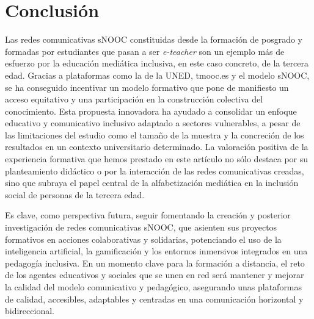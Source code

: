\section{Conclusión}\label{sec-conclusión}

Las redes comunicativas sNOOC constituidas desde la formación de
posgrado y formadas por estudiantes que pasan a ser \emph{e-teacher} son
un ejemplo más de esfuerzo por la educación mediática inclusiva, en este
caso concreto, de la tercera edad. Gracias a plataformas como la de la
UNED, tmooc.es y el modelo sNOOC, se ha conseguido incentivar un modelo
formativo que pone de manifiesto un acceso equitativo y una
participación en la construcción colectiva del conocimiento. Esta
propuesta innovadora ha ayudado a consolidar un enfoque educativo y
comunicativo inclusivo adaptado a sectores vulnerables, a pesar de las
limitaciones del estudio como el tamaño de la muestra y la concreción de
los resultados en un contexto universitario determinado. La valoración
positiva de la experiencia formativa que hemos prestado en este artículo
no sólo destaca por su planteamiento didáctico o por la interacción de
las redes comunicativas creadas, sino que subraya el papel central de la
alfabetización mediática en la inclusión social de personas de la
tercera edad.

Es clave, como perspectiva futura, seguir fomentando la creación y
posterior investigación de redes comunicativas sNOOC, que asienten sus
proyectos formativos en acciones colaborativas y solidarias, potenciando
el uso de la inteligencia artificial, la gamificación y los entornos
inmersivos integrados en una pedagogía inclusiva. En un momento clave
para la formación a distancia, el reto de los agentes educativos y
sociales que se unen en red será mantener y mejorar la calidad del
modelo comunicativo y pedagógico, asegurando unas plataformas de
calidad, accesibles, adaptables y centradas en una comunicación
horizontal y bidireccional.